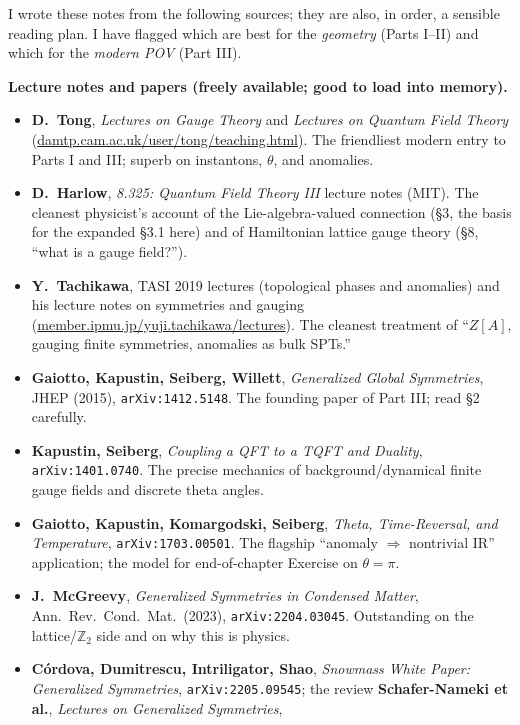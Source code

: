 \documentclass[11pt]{article}
\newcommand{\Ztwo}{\mathbb{Z}_2}
\begin{document}
\noindent
I wrote these notes from the following sources; they are also, in order, a sensible
reading plan. I have flagged which are best for the \emph{geometry} (Parts I--II) and
which for the \emph{modern POV} (Part III).
\sloppy

\medskip
\noindent\textbf{Lecture notes and papers (freely available; good to load into memory).}
\begin{itemize}\setlength{\itemsep}{2pt}
\item \textbf{D.\ Tong}, \emph{Lectures on Gauge Theory} and \emph{Lectures on Quantum
Field Theory} (\url{damtp.cam.ac.uk/user/tong/teaching.html}). The friendliest modern
entry to Parts I and III; superb on instantons, $\theta$, and anomalies.
\item \textbf{D.\ Harlow}, \emph{8.325: Quantum Field Theory III} lecture notes (MIT). The
cleanest physicist's account of the Lie-algebra-valued connection (\S3, the basis for the
expanded \S3.1 here) and of Hamiltonian lattice gauge theory (\S8, ``what is a gauge
field?'').
\item \textbf{Y.\ Tachikawa}, TASI 2019 lectures (topological phases and anomalies) and
his lecture notes on symmetries and gauging
(\url{member.ipmu.jp/yuji.tachikawa/lectures}). The cleanest treatment of
``$Z[A]$, gauging finite symmetries, anomalies as bulk SPTs.''
\item \textbf{Gaiotto, Kapustin, Seiberg, Willett}, \emph{Generalized Global
Symmetries}, JHEP (2015), \texttt{arXiv:1412.5148}. The founding paper of Part III; read
\S2 carefully.
\item \textbf{Kapustin, Seiberg}, \emph{Coupling a QFT to a TQFT and Duality},
\texttt{arXiv:1401.0740}. The precise mechanics of background/dynamical finite gauge
fields and discrete theta angles.
\item \textbf{Gaiotto, Kapustin, Komargodski, Seiberg}, \emph{Theta, Time-Reversal, and
Temperature}, \texttt{arXiv:1703.00501}. The flagship ``anomaly $\Rightarrow$
nontrivial IR'' application; the model for end-of-chapter Exercise on $\theta=\pi$.
\item \textbf{J.\ McGreevy}, \emph{Generalized Symmetries in Condensed Matter}, Ann.\
Rev.\ Cond.\ Mat.\ (2023), \texttt{arXiv:2204.03045}. Outstanding on the lattice/$\Ztwo$
side and on why this is physics.
\item \textbf{C\'ordova, Dumitrescu, Intriligator, Shao}, \emph{Snowmass White Paper:
Generalized Symmetries}, \texttt{arXiv:2205.09545}; the review
\textbf{Schafer-Nameki et al.}, \emph{Lectures on Generalized Symmetries},

\end{itemize}
\end{document}
